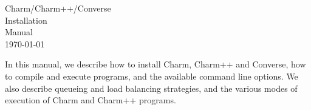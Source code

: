 %
%
%
%
%
%

\pagestyle{headings}
\setlength{\textwidth}{6.5in}
\setlength{\textheight}{9in}
\setlength{\parindent}{0in}
\setlength{\topmargin}{-.5in}
\parskip 0.1in
\newcommand{\zap}[1]{ }
\newcommand{\fcmd}{\bf}                 %
\newcommand{\fparm}{\bf\sf}             %
\newcommand{\fexec}{\bf}                %


 
\begin{titlepage}
\vspace*{2in}
\Huge
\begin{center}
Charm/Charm++/Converse \\
Installation\\
Manual\\
\vspace*{0.7in}
\today
\end{center}
\normalsize
\end{titlepage}

In this manual, we describe how to install Charm, Charm++ and
Converse, how to compile and execute programs, and the available
command line options.  We also describe queueing and load balancing
strategies, and the various modes of execution of Charm and Charm++ programs.






